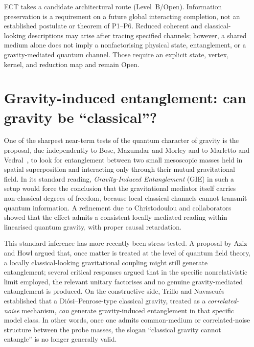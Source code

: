 \documentclass[11pt,a4paper]{article}
\begin{document}
ECT takes a candidate architectural route (Level~B/Open).  Information
preservation is a requirement on a future global interacting completion, not
an established postulate or theorem of P1--P6.  Reduced coherent
and classical-looking descriptions may arise after tracing specified channels;
however, a shared medium alone does not imply a nonfactorising physical state,
entanglement, or a gravity-mediated quantum channel.  Those require an explicit
state, vertex, kernel, and reduction map and remain Open.

\section{Gravity-induced entanglement: can gravity be ``classical''?}
\label{sec:pop_gie}

One of the sharpest near-term tests of the quantum character of
gravity is the proposal, due independently to Bose, Mazumdar and Morley
and to Marletto and Vedral~\cite{Bose_Mazumdar_Morley_2017,Marletto_Vedral_2017_GIE}, to look for entanglement between two
small mesoscopic masses held in spatial superposition and interacting
only through their mutual gravitational field. In its standard
reading, \emph{Gravity-Induced Entanglement} (GIE) in such a setup
would force the conclusion that the gravitational mediator itself
carries non-classical degrees of freedom, because local classical
channels cannot transmit quantum information. A refinement due to
Christodoulou and collaborators showed that the effect admits a
consistent locally mediated reading within linearised quantum
gravity, with proper causal retardation.

This standard inference has more recently been stress-tested.
A proposal by Aziz and Howl argued that, once matter is treated
at the level of quantum field theory, a locally classical-looking
gravitational coupling might still generate entanglement; several
critical responses argued that in the specific nonrelativistic
limit employed, the relevant unitary factorises and no genuine
gravity-mediated entanglement is produced. On the constructive side,
Trillo and Navascu\'es established that a Di\'osi--Penrose-type
classical gravity, treated as a \emph{correlated-noise} mechanism,
\emph{can} generate gravity-induced entanglement in that specific
model class. In other words, once one admits common-medium or
correlated-noise structure between the probe masses, the slogan
``classical gravity cannot entangle'' is no longer generally valid.
\end{document}
